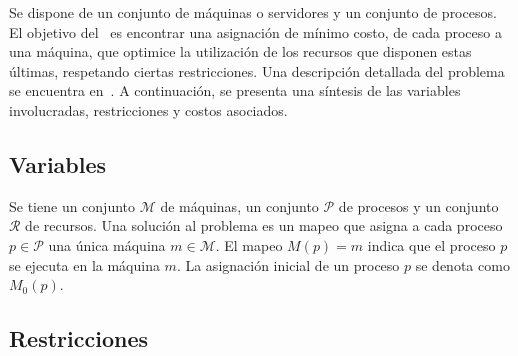 \documentclass[../informe2.tex]{subfiles}
\begin{document}

Se dispone de un conjunto  de máquinas o servidores y un conjunto de procesos. El objetivo del \mrp\ es encontrar una asignación de mínimo costo, de cada proceso a una máquina, que optimice la utilización de los recursos que disponen estas últimas, respetando ciertas restricciones. Una descripción detallada del problema se encuentra en~\cite{2012ProblemDefinition}. A continuación, se presenta una síntesis de las variables involucradas, restricciones y costos asociados.

\subsection{Variables}
Se tiene un conjunto $\mathcal{M}$ de máquinas, un conjunto $\mathcal{P}$ de procesos y un conjunto $\mathcal{R}$ de recursos. Una solución al problema es un mapeo que asigna a cada proceso $p \in \mathcal{P}$ una única máquina $m \in \mathcal{M}$. El mapeo $M(p) = m$ indica que el proceso $p$ se ejecuta en la máquina $m$. La asignación inicial de un proceso $p$ se denota como $M_0(p)$.


\subsection{Restricciones}
\end{document}

